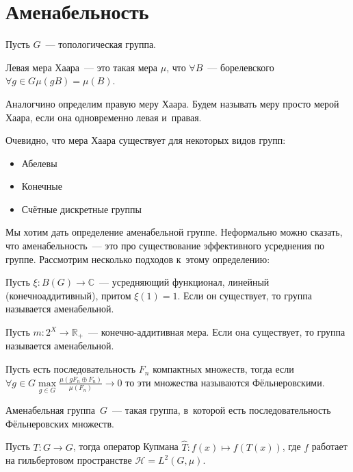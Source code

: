 \documentclass{article}
\begin{document}
\section{Аменабельность}

Пусть $G$~--- топологическая группа.

\begin{definition}
	Левая мера Хаара~--- это такая мера $\mu$, что $\forall B$~--- борелевского $\forall g \in G
	\mu(gB) = \mu(B)$.

	Аналогчино определим правую меру Хаара. Будем называть меру просто мерой Хаара, если она
	одновременно левая и~правая.
\end{definition}

Очевидно, что мера Хаара существует для некоторых видов групп:
\begin{itemize}
	\item Абелевы
	\item Конечные
	\item Счётные дискретные группы
\end{itemize}

Мы хотим дать определение аменабельной группе. Неформально можно сказать, что аменабельность~--- это
про существование эффективного усреднения по группе. Рассмотрим несколько подходов к~этому
определению:

\begin{definition}
	Пусть $\xi: B(G) \rightarrow \mathbb{C}$~--- усредняющий функционал, линейный (конечноаддитивный),
	притом $\xi(1) = 1$. Если он существует, то группа называется аменабельной.
\end{definition}

\begin{definition}
	Пусть $m: 2^X \rightarrow \mathbb{R}_+$~--- конечно-аддитивная мера. Если она существует, то
	группа называется аменабельной.
\end{definition}

\begin{definition}
	Пусть есть последовательность $F_n$ компактных множеств, тогда если $\forall g \in G
	\max\limits_{g \in G} \frac{\mu(gF_n \oplus F_n)}{\mu(F_n)} \rightarrow 0$ то эти множества
	называются Фёльнеровскими.

	Аменабельная группа~$G$~--- такая группа, в~которой есть последовательность Фёльнеровских
	множеств.
\end{definition}

\begin{definition}
	Пусть $T: G \rightarrow G$, тогда оператор Купмана $\hat{T}: f(x) \mapsto f(T(x))$, где $f$
	работает на гильбертовом пространстве $\mathcal{H} = L^2(G, \mu)$.
\end{definition}
\end{document}
